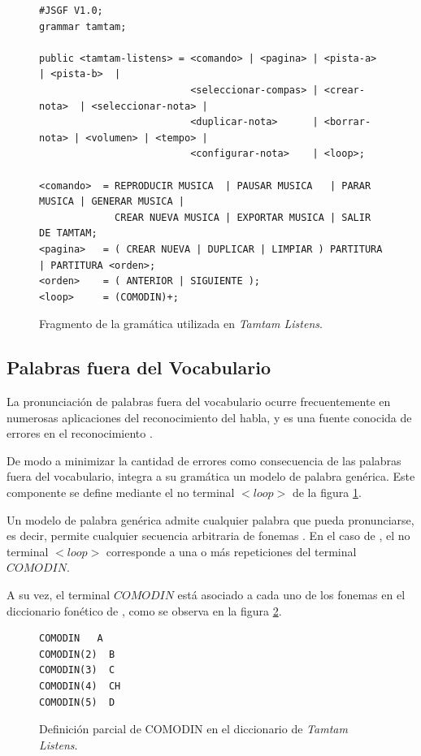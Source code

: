 \begin{figure}[H]
\begin{lstlisting}
#JSGF V1.0;
grammar tamtam;

public <tamtam-listens> = <comando> | <pagina> | <pista-a>     | <pista-b>  | 
                          <seleccionar-compas> | <crear-nota>  | <seleccionar-nota> | 
                          <duplicar-nota>      | <borrar-nota> | <volumen> | <tempo> | 
                          <configurar-nota>    | <loop>;

<comando>  = REPRODUCIR MUSICA  | PAUSAR MUSICA   | PARAR MUSICA | GENERAR MUSICA | 
             CREAR NUEVA MUSICA | EXPORTAR MUSICA | SALIR DE TAMTAM;
<pagina>   = ( CREAR NUEVA | DUPLICAR | LIMPIAR ) PARTITURA | PARTITURA <orden>;
<orden>    = ( ANTERIOR | SIGUIENTE );
<loop>     = (COMODIN)+;
\end{lstlisting}
\caption{Fragmento de la gram\'atica utilizada en \emph{Tamtam Listens}.}
\label{figure:fragmento-gram}
\end{figure} 


\subsection{Palabras fuera del Vocabulario}
\label{sec:oov}

La pronunciaci\'on de palabras fuera del vocabulario ocurre frecuentemente en numerosas aplicaciones
del reconocimiento del habla, y es una fuente conocida de errores en el reconocimiento \cite{Bazzi00Modeling}.

De modo a minimizar la cantidad de errores como consecuencia de las palabras fuera del vocabulario,
 integra a su gram\'atica un modelo de palabra gen\'erica. Este componente se
define mediante el no terminal $<loop>$ de la figura \ref{figure:fragmento-gram}.

Un modelo de palabra gen\'erica admite cualquier palabra que pueda pronunciarse, es decir, permite
cualquier secuencia arbitraria de fonemas \cite{Bazzi00Modeling}. 
En el caso de , el no terminal $<loop>$ corresponde a una o m\'as repeticiones del
terminal $COMODIN$.

A su vez, el terminal $COMODIN$ est\'a asociado a cada uno de los fonemas en el diccionario fon\'etico de
, como se observa en la figura \ref{figure:fragmento-comodin}.

\begin{figure}[H]
\begin{lstlisting}
COMODIN   A
COMODIN(2)  B
COMODIN(3)  C
COMODIN(4)  CH
COMODIN(5)  D
\end{lstlisting}
\caption{Definici\'on parcial de COMODIN en el diccionario de \emph{Tamtam Listens}.}
\label{figure:fragmento-comodin}
\end{figure}

